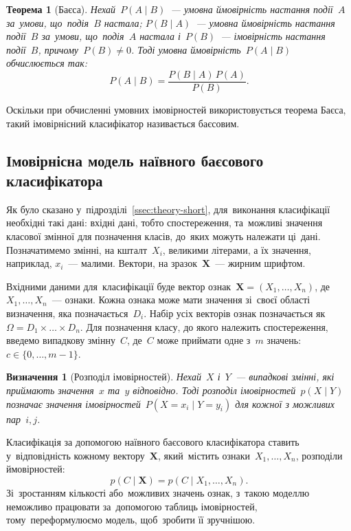 \documentclass[
	a4paper,
	oneside,
	DIV = 12,
	fontsize = 13pt,
	headings = normal,
	numbers = endperiod,
]{scrartcl}
\theoremstyle{mythm}
\newtheorem{mythm}{Теорема}
\newtheorem{mydef}{Визначення}
\newcommand{\myvec}[1]{\mathbf{#1}}
\begin{document}
			\begin{mythm}[Баєса]
				\label{thm:theorem-bayes}
				Нехай~$P(A \mid B)$~— умовна ймовірність настання події~$A$ за~умови, що~подія~$B$ настала; $P(B \mid A)$~— умовна ймовірність настання події~$B$ за~умови, що~подія~$A$ настала і~$P(B)$~— імовірність настання події~$B$, причому~$P(B) \neq 0$. Тоді умовна ймовірність~$P(A \mid B)$ обчислюється так:
				\[
					P(A \mid B) = \frac{P(B \mid A) \, P(A)}{P(B)}.
				\]
			\end{mythm}

			Оскільки при обчисленні умовних імовірностей використовується теорема Баєса, такий імовірнісний класифікатор називається баєсовим.

		\subsection{Імовірнісна модель наївного баєсового класифікатора}
			Як було сказано у~підрозділі~\ref{ssec:theory-short}, для~виконання класифікації необхідні такі дані: вхідні дані, тобто спостереження, та~можливі значення класової змінної для позначення класів, до~яких можуть належати ці~дані. Позначатимемо змінні, на кшталт~$X_i$, великими літерами, а їх значення, наприклад, $x_i$~— малими. Вектори, на зразок~$\myvec{X}$~— жирним шрифтом.
			
			Вхідними даними для~класифікації буде вектор ознак~$\myvec{X} = \left( X_1, \dots, X_n \right)$, де~$X_1, \dots, X_n$~— ознаки. Кожна ознака може мати значення зі~своєї області визначення, яка позначається~$D_i$. Набір усіх векторів ознак позначається як~$\Omega = D_1 \times \dots \times D_n$. Для позначення класу, до якого належить спостереження, введемо випадкову змінну~$C$, де~$C$ може приймати одне з~$m$ значень: $c \in \{ 0, \dots, m - 1\}$. 

			\begin{mydef}[Розподіл імовірностей]
				Нехай~$X$ і~$Y$~— випадкові змінні, які приймають значення~$x$ та~$y$ відповідно. Тоді розподіл імовірностей~$p(X \mid Y)$ позначає значення імовірностей~$P(X = x_i \mid Y = y_i)$ для кожної з можливих пар~$i, j$.~\cite{russel-norvig-ai-ma}
			\end{mydef}

			Класифікація за допомогою наївного баєсового класифікатора ставить у~відповідність кожному вектору~$\myvec{X}$, який~містить ознаки~$X_1, \dots, X_n$, розподіли ймовірностей:
			\begin{equation}
				p\left( C \mid \myvec{X} \right) = p\left( C \mid X_1, \dots, X_n \right).
			\end{equation}
			Зі~зростанням кількості або~можливих значень ознак, з~такою моделлю неможливо працювати за~допомогою таблиць імовірностей, тому~переформулюємо модель, щоб~зробити її зручнішою.
\end{document}
